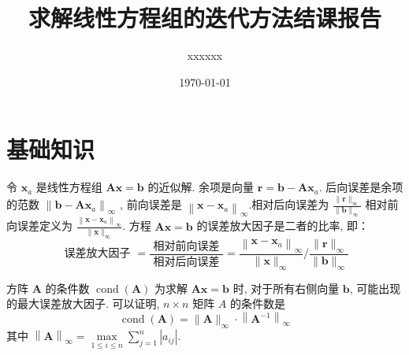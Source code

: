 \documentclass[a4paper]{article}
\title{求解线性方程组的迭代方法结课报告}
\author{xxxxxx}
\date{\today}
\numberwithin{equation}{section}
\newtheorem{definition}{Definition}
\newcommand{\bm}[1]{\boldsymbol{#1}}    %
\begin{document}
\maketitle

\section{基础知识}

令  $\bm{x}_{a}$  是线性方程组  $\bm{A x}=\bm{b}$  的近似解. 余项是向量  $\bm{r}=\bm{b}-\bm{A x}_{a}$. 后向误差是余项的范数  $\left\|\bm{b}-\bm{A x}_{a}\right\|_{\infty}$ , 前向误差是  $\left\|\bm{x}-\bm{x}_{a}\right\|_{\infty}$.相对后向误差为 $\frac{\|\bm{r}\|_{\infty}}{\|\bm{b}\|_{\infty}}$ 相对前向误差定义为 $\frac{\left\|\bm{x}-\bm{x}_{a}\right\|_{\infty}}{\|\bm{x}\|_{\infty}}$. 方程  $\bm{A x}=\bm{b}$ 的误差放大因子是二者的比率, 即：
\begin{equation}
    \text { 误差放大因子 }=\frac{\text { 相对前向误差 }}{\text { 相对后向误差 }}=\frac{\left\|\bm{x}-\bm{x}_{a}\right\|_{\infty}}{\|\bm{x}\|_{\infty}} \bigg/ \frac{\|\bm{r}\|_{\infty}}{\|\bm{b}\|_{\infty}}
\end{equation}


方阵  $\bm{A}$  的条件数  $\operatorname{cond}(\bm{A})$  为求解  $\bm{Ax} =\bm{b}$  时, 对于所有右侧向量  $\bm{b}$, 可能出现的最大误差放大因子. 可以证明, $n \times n$  矩阵  $A$  的条件数是
\begin{equation}
    \operatorname{cond}(\bm{A})=\|\bm{A}\|_\infty \cdot\left\|\bm{A}^{-1}\right\|_\infty
\end{equation}
其中 $\left\|\bm{A}\right\|_{\infty }=\max \limits _{1\leq i\leq n}\sum _{j=1}^{n}|a_{ij}|$.
\end{document}
